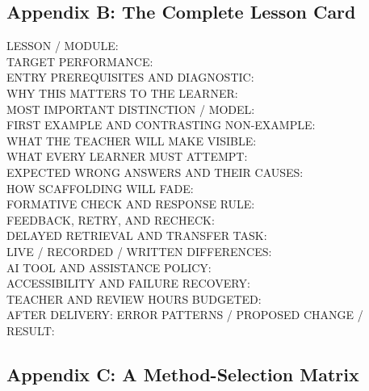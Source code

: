 \subsection*{Appendix B: The Complete Lesson Card}

\begin{tcolorbox}[colback=white,colframe=BayesSecondary!40,arc=2pt,boxrule=0.6pt,title={\small\textbf{The Complete Lesson Planning Card}}]
\footnotesize\ttfamily
LESSON / MODULE: \\
TARGET PERFORMANCE: \\
ENTRY PREREQUISITES AND DIAGNOSTIC: \\
WHY THIS MATTERS TO THE LEARNER: \\
MOST IMPORTANT DISTINCTION / MODEL: \\
FIRST EXAMPLE AND CONTRASTING NON-EXAMPLE: \\
WHAT THE TEACHER WILL MAKE VISIBLE: \\
WHAT EVERY LEARNER MUST ATTEMPT: \\
EXPECTED WRONG ANSWERS AND THEIR CAUSES: \\
HOW SCAFFOLDING WILL FADE: \\
FORMATIVE CHECK AND RESPONSE RULE: \\
FEEDBACK, RETRY, AND RECHECK: \\
DELAYED RETRIEVAL AND TRANSFER TASK: \\
LIVE / RECORDED / WRITTEN DIFFERENCES: \\
AI TOOL AND ASSISTANCE POLICY: \\
ACCESSIBILITY AND FAILURE RECOVERY: \\
TEACHER AND REVIEW HOURS BUDGETED: \\
AFTER DELIVERY: ERROR PATTERNS / PROPOSED CHANGE / RESULT:
\end{tcolorbox}

\subsection*{Appendix C: A Method-Selection Matrix}

